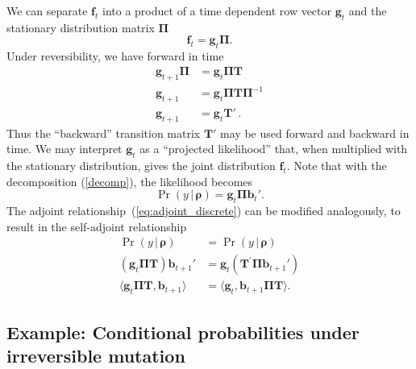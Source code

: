 \documentclass[preprint]{elsarticle}
\newcommand{\bs}[1]{\ensuremath{\boldsymbol{#1}}}
\newcommand\given{{\,|\,}}
\newcommand\x[1]{\ensuremath{x_{#1}}}
\newcommand\y{\ensuremath{y}}
\newcommand\fv[1]{\ensuremath{\mathbf{f}_{#1}}}
\newcommand\bv[1]{\ensuremath{\mathbf{b}_{#1}}}
\newcommand\gv[1]{\ensuremath{\mathbf{g}_{#1}}}
\begin{document}
We can separate $\fv{t}$ into a product of a time dependent row vector $\gv{t}$ and the stationary distribution matrix $\mathbf{\Pi}$
\begin{equation}\label{decomp}
\fv{t}=\gv{t}\mathbf{\Pi}.
\end{equation}
Under reversibility, we have forward in time
\begin{equation}
\begin{split}
\gv{t+1}\mathbf{\Pi} &=\gv{t}\mathbf{\Pi}\mathbf{T}\\
\gv{t+1}             &=\gv{t}\mathbf{\Pi}\mathbf{T}\mathbf{\Pi}^{-1}\\
\gv{t+1}             &=\gv{t}\mathbf{T}'\,.
\end{split}
\end{equation}
Thus the ``backward'' transition matrix $\mathbf{T}'$ may be used forward and backward in time. We may interpret $\gv{t}$
as a ``projected likelihood'' that, when multiplied with the stationary distribution, gives the joint distribution $\fv{t}$. Note that with the decomposition (\ref{decomp}), the likelihood becomes
\begin{equation}
\Pr(\y \given \bs{\rho}) = \gv{t} \mathbf{\Pi} \bv{t}'.
\end{equation}
The adjoint relationship~(\ref{eq:adjoint_discrete}) can be modified analogously, to result in the self-adjoint relationship
\begin{equation}\label{eq:adjoint_discrete_2}
\begin{split}
\Pr(\y \given \bs{\rho})                              & = \Pr(\y \given \bs{\rho})                    \\
(\gv{t}\mathbf{\Pi} \mathbf{T}) \bv{t+1}'             & = \gv{t}(\mathbf{T}^{'}\mathbf{\Pi}\bv{t+1}') \\
\langle \gv{t}\mathbf{\Pi}\mathbf{T},\bv{t+1}\rangle         & = 
\langle \gv{t},\bv{t+1}\mathbf{\Pi}\mathbf{T}\rangle.
\end{split}
\end{equation}

\subsection{Example: Conditional probabilities under irreversible mutation}\label{section:irreversible}
\end{document}
